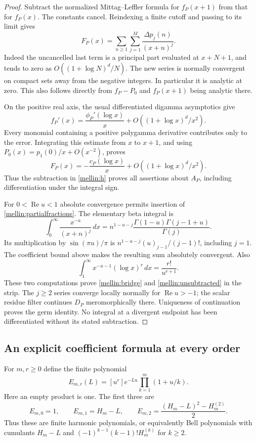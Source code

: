 \begin{proof}
Subtract the normalized Mittag--Leffler formula for $f_P(x+1)$ from
that for $f_P(x)$.  The constants cancel.  Reindexing a finite cutoff
and passing to its limit gives
\begin{equation}\label{mellin:partialfractions}
 F_P(x)=\sum_{n\ge1}\sum_{j=1}^{M}
               \frac{\Delta p_j(n)}{(x+n)^j}.
\end{equation}
Indeed the uncancelled last term is a principal part evaluated at
$x+N+1$, and tends to zero as
$O((1+\log N)^d/N)$.  The new series is normally convergent on
compact sets away from the negative integers.  In particular it is
analytic at zero.  This also follows directly from
$f_P-P_0$ and $f_P(x+1)$ being analytic there.

On the positive real axis, the usual differentiated digamma asymptotics
give
\[
 f_P'(x)=\frac{\phi_P'(\log x)}x
           +O((1+\log x)^d/x^2).
\]
Every monomial containing a positive polygamma derivative contributes
only to the error.  Integrating this estimate from $x$ to $x+1$, and
using $P_0(x)=p_1(0)/x+O(x^{-2})$, proves
\[
 F_P(x)=-\frac{c_P(\log x)}x
              +O((1+\log x)^d/x^2).
\]
Thus the subtraction in \eqref{mellin:h} proves all assertions about
$A_P$, including differentiation under the integral sign.

For $0<\operatorname{Re}u<1$ absolute convergence permits insertion
of \eqref{mellin:partialfractions}.  The elementary beta integral is
\[
 \int_0^\infty\frac{x^{-u}}{(x+n)^j}\,dx
 =n^{1-u-j}\frac{\Gamma(1-u)\Gamma(j-1+u)}{\Gamma(j)}.
\]
Its multiplication by $\sin(\pi u)/\pi$ is
$n^{1-u-j}(u)_{j-1}/(j-1)!$, including $j=1$.
The coefficient bound above makes the resulting sum absolutely
convergent.  Also
\[
 \int_1^\infty x^{-u-1}(\log x)^r\,dx=\frac{r!}{u^{r+1}}.
\]
These two computations prove \eqref{mellin:bridge} and
\eqref{mellin:unsubtracted} in the strip.  The $j\ge2$ series
converge locally normally for $\operatorname{Re}u>-1$; the scalar
residue filter continues $D_P$ meromorphically there.  Uniqueness of
continuation proves the germ identity.  No integral at a divergent
endpoint has been differentiated without its stated subtraction.
\end{proof}

\subsection{An explicit coefficient formula at every order}

For $m,r\ge0$ define the finite polynomial
\begin{equation}\label{mellin:E}
 E_{m,r}(L)=[u^r]e^{-Lu}\prod_{k=1}^{m}(1+u/k).
\end{equation}
Here an empty product is one.  The first three are
\[
 E_{m,0}=1,\qquad E_{m,1}=H_m-L,\qquad
 E_{m,2}=\frac{(H_m-L)^2-H_m^{(2)}}2.
\]
Thus these are finite harmonic polynomials, or equivalently Bell
polynomials with cumulants $H_m-L$ and
$(-1)^{k-1}(k-1)!H_m^{(k)}$ for $k\ge2$.

